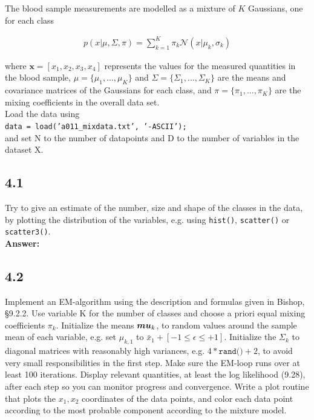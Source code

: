 \documentclass[a4paper]{article}
\begin{document}
The blood sample measurements are modelled as a mixture of $K$ Gaussians, one for each class

\begin{eqnarray} \label{eq:7}
p(x | \mu, \Sigma, \pi) = \sum^K_{k = 1} \pi_k \mathcal{N}(x | \mu_k, \sigma_k)
\end{eqnarray}

where $\textbf{x} = [x_1, x_2, x_3, x_4]$ represents the values for the measured quantities in the blood sample, $\mu = \{ \mu_1, ..., \mu_K\}$ and $\Sigma = \{ \Sigma_1, ..., \Sigma_K\}$ are the means and covariance matrices of the Gaussians for each class, and $\pi = \{ \pi_1, ..., \pi_K\}$ are the mixing coefficients in the overall data set.\\

Load the data using\\

\hspace{1cm} \texttt{data = load('a011\_mixdata.txt', '-ASCII');}\\

and set N to the number of datapoints and D to the number of variables in the dataset X.

\subsection*{4.1}

Try to give an estimate of the number, size and shape of the classes in the data, by plotting the distribution of the variables, e.g. using \texttt{hist()}, \texttt{scatter()} or \texttt{scatter3()}.\\

\textbf{Answer:}\\






\subsection*{4.2}

Implement an EM-algorithm using the description and formulas given in Bishop, §9.2.2. Use variable K for the number of classes and choose a priori equal mixing coefficients $\pi_k$. Initialize the means $\boldsymbol{\\mu}_k$, to random values around the sample mean of each variable, e.g. set $\mu_{k,1}$ to  $\bar{x}_1 + [-1 \leq \epsilon \leq +1]$. Initialize the $\Sigma_k$ to diagonal matrices with reasonably high variances, e.g. $4*\texttt{rand()}+2$, to avoid very small responsibilities in the first step. Make sure the EM-loop runs over at least 100 iterations. Display relevant quantities, at least the log likelihood (9.28), after each step so you can monitor progress and convergence. Write a plot routine that plots the $x_1, x_2$ coordinates of the data points, and color each data point according to the most probable component according to the mixture model.\\
\end{document}
